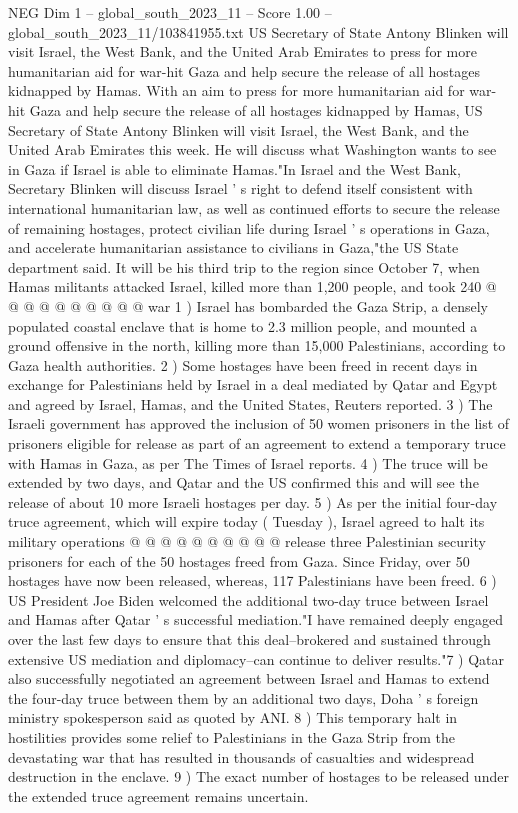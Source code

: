 \begin{textsample}{NEG Dim 1 – global\_south\_2023\_11 – Score 1.00 – global\_south\_2023\_11/103841955.txt}  \label{ex:f1_neg_235}
US Secretary of State Antony Blinken will visit Israel, the West Bank, and the United Arab Emirates to press for more humanitarian aid for war-hit Gaza and help secure the release of all hostages kidnapped by Hamas.
With an aim to press for more humanitarian aid for war-hit Gaza and help secure the release of all hostages kidnapped by Hamas, US Secretary of State Antony Blinken will visit Israel, the West Bank, and the United Arab Emirates this week.
He will discuss what Washington wants to see in Gaza if Israel is able to eliminate Hamas."In Israel and the West Bank, Secretary Blinken will discuss Israel ' s right to defend itself consistent with international humanitarian law, as well as continued efforts to secure the release of remaining hostages, protect civilian life during Israel ' s operations in Gaza, and accelerate humanitarian assistance to civilians in Gaza,"the US State department said.
It will be his third trip to the region since October 7, when Hamas militants attacked Israel, killed more than 1,200 people, and took 240 @ @ @ @ @ @ @ @ @ @ war 1 ) Israel has bombarded the Gaza Strip, a densely populated coastal enclave that is home to 2.3 million people, and mounted a ground offensive in the north, killing more than 15,000 Palestinians, according to Gaza health authorities. 2 ) Some hostages have been freed in recent days in exchange for Palestinians held by Israel in a deal mediated by Qatar and Egypt and agreed by Israel, Hamas, and the United States, Reuters reported. 3 ) The Israeli government has approved the inclusion of 50 women prisoners in the list of prisoners eligible for release as part of an agreement to extend a temporary truce with Hamas in Gaza, as per The Times of Israel reports. 4 ) The truce will be extended by two days, and Qatar and the US confirmed this and will see the release of about 10 more Israeli hostages per day. 5 ) As per the initial four-day truce agreement, which will expire today ( Tuesday ), Israel agreed to halt its military operations @ @ @ @ @ @ @ @ @ @ release three Palestinian security prisoners for each of the 50 hostages freed from Gaza.
Since Friday, over 50 hostages have now been released, whereas, 117 Palestinians have been freed. 6 ) US President Joe Biden welcomed the additional two-day truce between Israel and Hamas after Qatar ' s successful mediation."I have remained deeply engaged over the last few days to ensure that this deal--brokered and sustained through extensive US mediation and diplomacy--can continue to deliver results."7 ) Qatar also successfully negotiated an agreement between Israel and Hamas to extend the four-day truce between them by an additional two days, Doha ' s foreign ministry spokesperson said as quoted by ANI. 8 ) This temporary halt in hostilities provides some relief to Palestinians in the Gaza Strip from the devastating war that has resulted in thousands of casualties and widespread destruction in the enclave. 9 ) The exact number of hostages to be released under the extended truce agreement remains uncertain.

\end{textsample}
